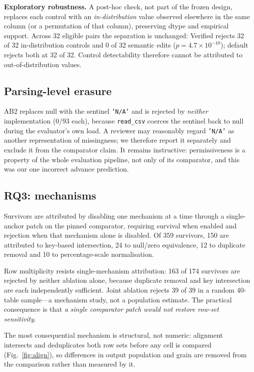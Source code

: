 \documentclass[10pt,conference]{IEEEtran}
\begin{document}
\textbf{Exploratory robustness.} A post-hoc check, not part of the frozen design,
replaces each control with an \emph{in-distribution} value observed elsewhere in
the same column (or a permutation of that column), preserving dtype and empirical
support. Across 32 eligible pairs the separation is unchanged: Verified rejects
32 of 32 in-distribution controls and 0 of 32 semantic edits
($p=4.7\times10^{-10}$); default rejects both at 32 of 32. Control detectability
therefore cannot be attributed to out-of-distribution values.

\subsection{Parsing-level erasure}
\label{sec:parse}

AB2 replaces null with the sentinel \texttt{'N/A'} and is rejected by
\emph{neither} implementation (0/93 each), because \texttt{read\_csv} coerces the
sentinel back to null during the evaluator's own load. A reviewer may reasonably
regard \texttt{'N/A'} as another representation of missingness; we therefore
report it separately and exclude it from the comparator claim. It remains
instructive: permissiveness is a property of the whole evaluation pipeline, not
only of its comparator, and this was our one incorrect advance prediction.

\subsection{RQ3: mechanisms}

Survivors are attributed by disabling one mechanism at a time through a
single-anchor patch on the pinned comparator, requiring survival when enabled and
rejection when that mechanism alone is disabled. Of 359 survivors, 150 are
attributed to key-based intersection, 24 to null/zero equivalence, 12 to duplicate
removal and 10 to percentage-scale normalisation.

Row multiplicity resists single-mechanism attribution: 163 of 174 survivors are
rejected by neither ablation alone, because duplicate removal and key intersection
are each independently sufficient. Joint ablation rejects 39 of 39 in a random
40-table sample---a mechanism study, not a population estimate. The practical
consequence is that \emph{a single comparator patch would not restore row-set
sensitivity}.

The most consequential mechanism is structural, not numeric: alignment intersects
and deduplicates both row sets before any cell is compared
(Fig.~\ref{fig:align}), so differences in output population and grain are removed
from the comparison rather than measured by it.
\end{document}
